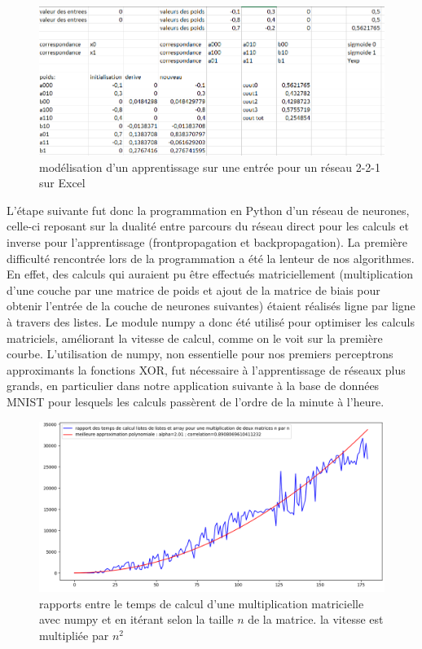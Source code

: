 \documentclass[
    10pt,
    a4paper,
    oneside,
    headinclude,footinclude,
    BCOR=5mm,
    captions=tableabove
]{scrartcl}
\begin{document}
\begin{figure}[!h]
\includegraphics[width=\linewidth]{excelXOR.png}
\centering
 \caption{modélisation d'un apprentissage sur une entrée pour un réseau 2-2-1 sur Excel}
 \label{fig:excelXOR}
\end{figure}
\vspace{5mm}
L'étape suivante fut donc la programmation en Python d'un réseau de neurones, celle-ci reposant sur la dualité entre parcours du réseau direct pour les calculs et inverse pour l'apprentissage (frontpropagation et backpropagation). La première difficulté rencontrée lors de la programmation a été la lenteur de nos algorithmes. En effet, des calculs qui auraient pu être effectués matriciellement (multiplication d'une couche par une matrice de poids et ajout de la matrice de biais pour obtenir l'entrée de la couche de neurones suivantes) étaient réalisés ligne par ligne à travers des listes. Le module numpy a donc été utilisé pour optimiser les calculs matriciels, améliorant la vitesse de calcul, comme on le voit sur la première courbe. L'utilisation de numpy, non essentielle pour nos premiers perceptrons approximants la fonctions XOR, fut nécessaire à l'apprentissage de réseaux plus grands, en particulier dans notre application suivante à la base de données MNIST pour lesquels les calculs passèrent de l'ordre de la minute à l'heure.

\begin{figure}[h!]
\includegraphics[width=\linewidth]{tpsCalcul.png}
\centering
 \caption{rapports entre le temps de calcul d'une multiplication matricielle avec numpy et en itérant selon la taille $n$ de la matrice. la vitesse est multipliée par  $n^{2}$ }
 \label{fig:tpsCalcul}
\end{figure}
\end{document}
